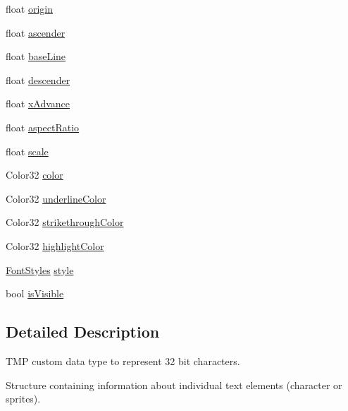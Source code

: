 \begin{DoxyCompactItemize}
float \mbox{\hyperlink{struct_t_m_pro_1_1_t_m_p___character_info_adb1943c1989c4178129a3763af82ef09}{origin}}
\item 
float \mbox{\hyperlink{struct_t_m_pro_1_1_t_m_p___character_info_acd65de977d60a3e11f0c8d9140dddc49}{ascender}}
\item 
float \mbox{\hyperlink{struct_t_m_pro_1_1_t_m_p___character_info_aa4e9ea324c757e38321a2fe59c8c1287}{base\+Line}}
\item 
float \mbox{\hyperlink{struct_t_m_pro_1_1_t_m_p___character_info_a0a62bfa98a47664244fff9eee1e045bd}{descender}}
\item 
float \mbox{\hyperlink{struct_t_m_pro_1_1_t_m_p___character_info_a4ba39cef6ade72a09842f713363c1bea}{x\+Advance}}
\item 
float \mbox{\hyperlink{struct_t_m_pro_1_1_t_m_p___character_info_a22daedfb6f2d97bf53f36c80d5492bc1}{aspect\+Ratio}}
\item 
float \mbox{\hyperlink{struct_t_m_pro_1_1_t_m_p___character_info_aa6eae7bb3d16d8601eb1f5d02e9775a5}{scale}}
\item 
Color32 \mbox{\hyperlink{struct_t_m_pro_1_1_t_m_p___character_info_ad5f756553535a3e260ad527b5626d74a}{color}}
\item 
Color32 \mbox{\hyperlink{struct_t_m_pro_1_1_t_m_p___character_info_ab785a7374a128e74fb7019e3e845b304}{underline\+Color}}
\item 
Color32 \mbox{\hyperlink{struct_t_m_pro_1_1_t_m_p___character_info_a9dc9d6c779bd740d6015e8147fd26c20}{strikethrough\+Color}}
\item 
Color32 \mbox{\hyperlink{struct_t_m_pro_1_1_t_m_p___character_info_abdcd1a82f6273a7e05f6bb7facd98fc2}{highlight\+Color}}
\item 
\mbox{\hyperlink{namespace_t_m_pro_aedf79b6e7e2ce2b9c9ac84e790596e7c}{Font\+Styles}} \mbox{\hyperlink{struct_t_m_pro_1_1_t_m_p___character_info_a91b644f2949e102fd9d4900c15e9a850}{style}}
\item 
bool \mbox{\hyperlink{struct_t_m_pro_1_1_t_m_p___character_info_a9c79be41abefbe85ee0f4bc3d330ea4f}{is\+Visible}}
\end{DoxyCompactItemize}


\subsection{Detailed Description}
T\+MP custom data type to represent 32 bit characters. 

Structure containing information about individual text elements (character or sprites). 

